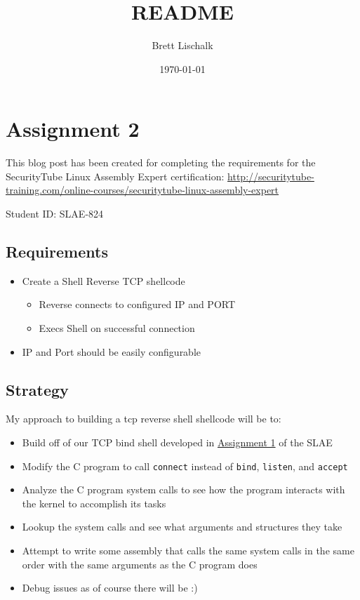 \documentclass[11pt]{article}
\author{Brett Lischalk}
\date{\today}
\title{README}
\begin{document}
\maketitle
\tableofcontents

\section{Assignment 2}
\label{sec-1}

This blog post has been created for completing the requirements for the SecurityTube
Linux Assembly Expert certification:
\href{http://securitytube-training.com/online-courses/securitytube-linux-assembly-expert}{\url{http://securitytube-training.com/online-courses/securitytube-linux-assembly-expert}}

Student ID: SLAE-824

\subsection{Requirements}
\label{sec-1-1}

\begin{itemize}
\item Create a Shell Reverse TCP shellcode
\begin{itemize}
\item Reverse connects to configured IP and PORT
\item Execs Shell on successful connection
\end{itemize}
\item IP and Port should be easily configurable
\end{itemize}

\subsection{Strategy}
\label{sec-1-2}

My approach to building a tcp reverse shell shellcode will be to:

\begin{itemize}
\item Build off of our TCP bind shell developed in \href{http://www.brettlischalk.com/posts/slae-problem-1-tcp-bind-shell-shellcode}{Assignment 1} of the SLAE
\item Modify the C program to call \verb~connect~ instead of \verb~bind~, \verb~listen~, and \verb~accept~
\item Analyze the C program system calls to see how the program interacts with the kernel to accomplish its tasks
\item Lookup the system calls and see what arguments and structures they take
\item Attempt to write some assembly that calls the same system calls in the same order with the same arguments as the C program does
\item Debug issues as of course there will be :)
\end{itemize}
\end{document}
